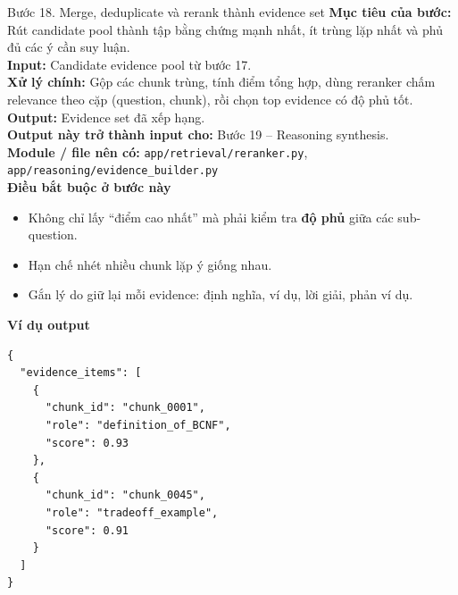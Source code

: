 \documentclass[12pt,a4paper]{article}
\newcommand{\stepgoal}[1]{\textbf{Mục tiêu của bước:} #1\\}
\newcommand{\stepinput}[1]{\textbf{Input:} #1\\}
\newcommand{\stepprocess}[1]{\textbf{Xử lý chính:} #1\\}
\newcommand{\stepoutput}[1]{\textbf{Output:} #1\\}
\newcommand{\stepnext}[1]{\textbf{Output này trở thành input cho:} #1\\}
\newcommand{\stepmodules}[1]{\textbf{Module / file nên có:} #1\\}
\begin{document}
\begin{stepbox}{Bước 18. Merge, deduplicate và rerank thành evidence set}
\stepgoal{Rút candidate pool thành tập bằng chứng mạnh nhất, ít trùng lặp nhất và phủ đủ các ý cần suy luận.}
\stepinput{Candidate evidence pool từ bước 17.}
\stepprocess{Gộp các chunk trùng, tính điểm tổng hợp, dùng reranker chấm relevance theo cặp (question, chunk), rồi chọn top evidence có độ phủ tốt.}
\stepoutput{Evidence set đã xếp hạng.}
\stepnext{Bước 19 -- Reasoning synthesis.}
\stepmodules{\texttt{app/retrieval/reranker.py}, \texttt{app/reasoning/evidence\_builder.py}}

\textbf{Điều bắt buộc ở bước này}
\begin{itemize}
    \item Không chỉ lấy ``điểm cao nhất'' mà phải kiểm tra \textbf{độ phủ} giữa các sub-question.
    \item Hạn chế nhét nhiều chunk lặp ý giống nhau.
    \item Gắn lý do giữ lại mỗi evidence: định nghĩa, ví dụ, lời giải, phản ví dụ.
\end{itemize}

\textbf{Ví dụ output}
\begin{lstlisting}
{
  "evidence_items": [
    {
      "chunk_id": "chunk_0001",
      "role": "definition_of_BCNF",
      "score": 0.93
    },
    {
      "chunk_id": "chunk_0045",
      "role": "tradeoff_example",
      "score": 0.91
    }
  ]
}
\end{lstlisting}
\end{stepbox}
\end{document}
